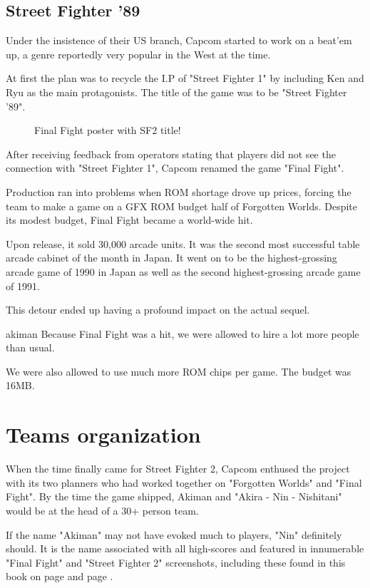 \subsection{Street Fighter '89}
Under the insistence of their US branch, Capcom started to work on a beat'em up, a genre reportedly very popular in the West at the time.

At first the plan was to recycle the I.P of "Street Fighter 1" by including Ken and Ryu as the main protagonists. The title of the game was to be "Street Fighter '89".

\begin{figure}[H]
\caption*{Final Fight poster with SF2 title!}
\end{figure}

After receiving feedback from operators stating that players did not see the connection with "Street Fighter 1", Capcom renamed the game "Final Fight".

Production ran into problems when ROM shortage drove up prices, forcing the team to make a game on a GFX ROM budget half of Forgotten Worlds. Despite its modest budget, Final Fight became a world-wide hit.

Upon release, it sold 30,000 arcade units. It was the second most successful table arcade cabinet of the month in Japan. It went on to be the highest-grossing arcade game of 1990 in Japan as well as the second highest-grossing arcade game of 1991. 

This detour ended up having a profound impact on the actual sequel. 

\begin{q}{akiman\cite{gameMaestro4}}
  Because Final Fight was a hit, we were allowed to hire a lot more people than usual. 

  We were also allowed to use much more ROM chips per game. The budget was 16MB.
\end{q}






\section{Teams organization}
When the time finally came for Street Fighter 2, Capcom enthused the project with its two planners who had worked together on "Forgotten Worlds" and "Final Fight". By the time the game shipped, Akiman and "Akira - Nin - Nishitani" would be at the head of a 30+ person team.

\begin{trivia}
If the name "Akiman" may not have evoked much to players, "Nin" definitely should. It is the name associated with all high-scores and featured in innumerable "Final Fight" and "Street Fighter 2" screenshots, including these found in this book on page \pageref{nin_ff} and page \pageref{nin_sf2}.  
\end{trivia}

